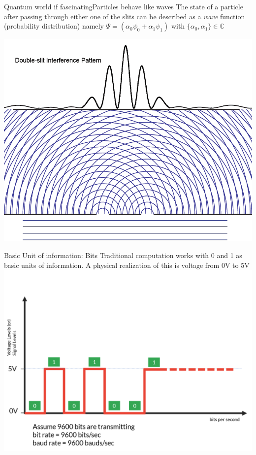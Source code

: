 \documentclass{beamer}
\begin{document}
\begin{frame}{Quantum world if fascinating}{Particles behave like waves}
	\justifying
	The state of a particle after passing through either one of the slits can be described as a \textit{wave} function (probability distribution) namely $\Psi = (\alpha_0 \psi_0 + \alpha_1 \psi_1)$ with $\{\alpha_0,\alpha_1\} \in \mathbb{C}$
	
	\center
	\includegraphics[keepaspectratio=true,width=.5\paperwidth]{.attachments/double-slit-distro.png}
\end{frame}


\begin{frame}{Basic Unit of information: Bits}
	\justifying
	Traditional computation works with 0 and 1 as basic units of information. A physical realization of this is voltage from 0V to 5V
	\center
	\includegraphics[keepaspectratio=true,width=.6\paperwidth]{.attachments/Bitrateequalbaudrate.png}
\end{frame}
\end{document}
